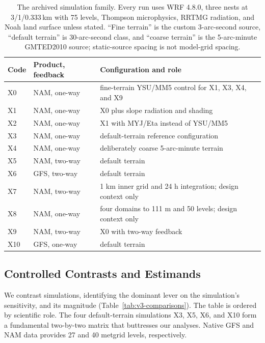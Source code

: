\documentclass[air,article,submit,moreauthors]{Definitions/mdpi}
\begin{document}
\begin{table}[H]
\caption{The archived simulation family.
Every run uses WRF 4.8.0, three nests at 3/1/0.333\,km with 75 levels, Thompson microphysics, RRTMG radiation, and Noah land surface unless stated.
``Fine terrain'' is the custom 3-arc-second source, ``default terrain'' is 30-arc-second class, and ``coarse terrain'' is the 5-arc-minute GMTED2010 source; static-source spacing is not model-grid spacing.}
\label{tab:v3-family}
\centering
\small
\begin{tabularx}{\textwidth}{llL}
\toprule
Code & Product, feedback & Configuration and role \\
\midrule
X0  & NAM, one-way & fine-terrain YSU/MM5 control for X1, X3, X4, and X9 \\
X1  & NAM, one-way & X0 plus slope radiation and shading \\
X2  & NAM, one-way & X1 with MYJ/Eta instead of YSU/MM5 \\
X3  & NAM, one-way & default-terrain reference configuration \\
X4  & NAM, one-way & deliberately coarse 5-arc-minute terrain \\
X5  & NAM, two-way & default terrain \\
X6  & GFS, two-way & default terrain \\
X7  & NAM, two-way & 1 km inner grid and 24 h integration; design context only \\
X8  & NAM, one-way & four domains to 111 m and 50 levels; design context only \\
X9  & NAM, two-way & X0 with two-way feedback \\
X10 & GFS, one-way & default terrain \\
\bottomrule
\end{tabularx}
\end{table}

\subsection{Controlled Contrasts and Estimands}
\label{sec:v3-contrasts}

We contrast simulations, identifying the dominant lever on the simulation's sensitivity, and its magnitude (Table~\ref{tab:v3-comparisons}).  The table is ordered by scientific role.
The four default-terrain simulations X3, X5, X6, and X10 form a fundamental two-by-two matrix that buttresses our analyses. 
Native GFS and NAM data provides 27 and 40 metgrid levels, respectively.
\end{document}
